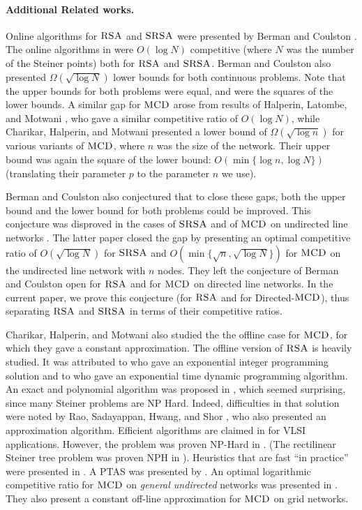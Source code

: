 \documentclass[11pt]{article}
\newcommand{\MCD}{\mbox{\sc MCD}}
\newcommand{\StRSA}{\mbox{\sc SRSA}}
\newcommand{\SRSA}{\mbox{\sc SRSA}}
\newcommand{\RSA}{\mbox{\sc RSA}}
\begin{document}
\paragraph*{Additional Related works.}
Online algorithms for $\RSA$ and $\StRSA$ were presented by Berman and Coulston \cite{berman}.
The online algorithms in \cite{berman} were $O({\log N})$ competitive (where $N$ was the number of the Steiner points) both for $\RSA$ and $\SRSA$.
Berman and Coulston also presented $\Omega{(\sqrt{\log N})}$ lower bounds for both continuous problems.
Note that the upper bounds for both problems were equal, and were the squares of the lower bounds.
A similar gap for $\MCD$ arose from results of Halperin, Latombe, and  Motwani \cite{halperin1}, who gave a similar  competitive ratio of $O(\log N )$,
while  Charikar, Halperin,  and Motwani \cite{halperin} presented a lower bound of $\Omega(\sqrt{\log n})$  for various variants of $\MCD$,  where $n$ was the size of the network.
Their upper bound was again the square of the lower bound:
$O(\min \{ \log n, \log N \} )$  (translating their parameter $p$ to the parameter $n$ we use).




Berman and Coulston also conjectured that to close these gaps, both the upper bound and the lower bound
for both problems could be improved.
This conjecture was disproved in the cases of  $\SRSA$ and of $\MCD$ on undirected line networks \cite{KK2014}.
The latter paper closed the gap by presenting an optimal competitive ratio of $O(\sqrt{\log N})$ for $\SRSA$ and
$O(\min\{\sqrt{n},\sqrt{\log N}\})$ for $\MCD$ on the undirected line network with $n$ nodes.
They left the conjecture of Berman and Coulston open for $\RSA$ and for $\MCD$ on directed line networks.
In the current paper, we prove this conjecture (for $\RSA$ and for Directed-$\MCD$), thus separating $\RSA$ and $\SRSA$ in terms of their competitive ratios.



Charikar, Halperin, and Motwani \cite{halperin} also studied the  the offline case for $\MCD$, for which they gave   a constant approximation.
The offline version of $\RSA$ is heavily studied.
It was  attributed to    \cite{natansky} who gave an exponential integer programming solution and to \cite{presented-rsa} who gave an exponential time dynamic programming algorithm.
An exact and polynomial algorithm was proposed in \cite{rsa-error}, which seemed surprising, since many Steiner  problems are NP Hard.
Indeed, difficulties in that solution were noted by Rao, Sadayappan, Hwang, and Shor \cite{shor-rsa}, who also presented an approximation algorithm.
Efficient algorithms are claimed in \cite{another-at-poly} for VLSI applications.
However, the problem was proven NP-Hard in \cite{rsa-nph}.
(The rectilinear Steiner tree problem was proven NPH in \cite{garey-johnson}).
Heuristics that are fast ``in practice'' were presented in \cite{cong}.
A PTAS was presented by \cite{ptas1}.
An optimal logarithmic competitive ratio for $\MCD$ on {\em general undirected} networks was presented in \cite{MAicalp12}.
They also present a constant off-line approximation for $\MCD$ on grid networks.
\end{document}
